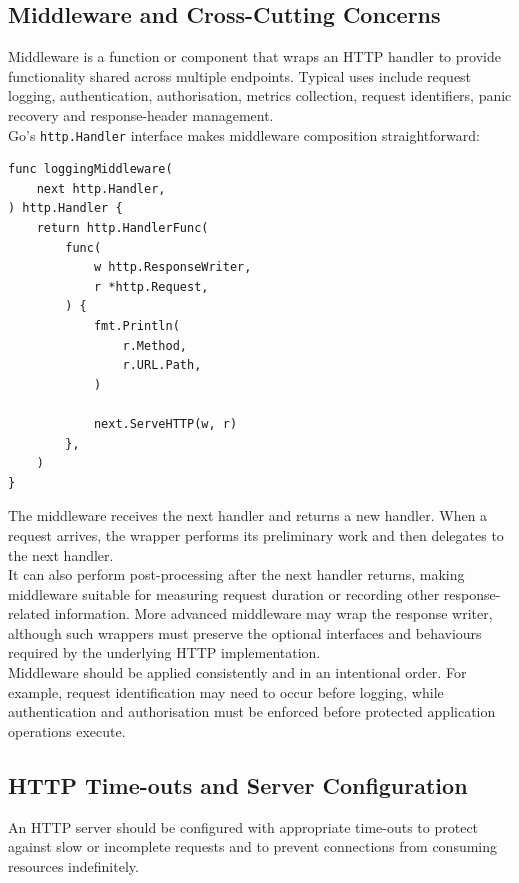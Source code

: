\subsection{Middleware and Cross-Cutting Concerns}

Middleware is a function or component that wraps an HTTP handler to provide functionality shared across multiple endpoints. Typical uses include request logging, authentication, authorisation, metrics collection, request identifiers, panic recovery and response-header management.\\

Go's \texttt{http.Handler} interface makes middleware composition straightforward:

\begin{lstlisting}
func loggingMiddleware(
    next http.Handler,
) http.Handler {
    return http.HandlerFunc(
        func(
            w http.ResponseWriter,
            r *http.Request,
        ) {
            fmt.Println(
                r.Method,
                r.URL.Path,
            )

            next.ServeHTTP(w, r)
        },
    )
}
\end{lstlisting}

The middleware receives the next handler and returns a new handler. When a request arrives, the wrapper performs its preliminary work and then delegates to the next handler.\\

It can also perform post-processing after the next handler returns, making middleware suitable for measuring request duration or recording other response-related information. More advanced middleware may wrap the response writer, although such wrappers must preserve the optional interfaces and behaviours required by the underlying HTTP implementation.\\

Middleware should be applied consistently and in an intentional order. For example, request identification may need to occur before logging, while authentication and authorisation must be enforced before protected application operations execute.\\

\subsection{HTTP Time-outs and Server Configuration}

An HTTP server should be configured with appropriate time-outs to protect against slow or incomplete requests and to prevent connections from consuming resources indefinitely.\\

